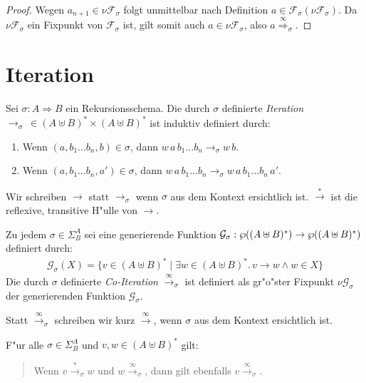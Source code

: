 \documentclass[12pt,a4paper]{article}
\begin{document}
\begin{proof}
  Wegen $a_{n+1}\in\nu\mathcal{F}_\sigma$ folgt unmittelbar nach Definition
  $a \in \mathcal{F}_\sigma(\nu\mathcal{F}_\sigma)$. Da $\nu\mathcal{F}_\sigma$
  ein Fixpunkt von $\mathcal{F}_\sigma$ ist, gilt somit auch $a \in \nu\mathcal{F}_\sigma$, also
  $a \stackrel{\infty}{\Rightarrow}_\sigma$.
\end{proof}


\section{Iteration}

\begin{definition}[Iteration]
  Sei $\sigma: A \Rightarrow B$ ein Rekursionsschema. Die durch $\sigma$ definierte \emph{Iteration}
  $\to_\sigma\ \in (A \uplus B)^* \times (A \uplus B)^*$ ist induktiv definiert durch:
  \begin{enumerate}
  \item Wenn $(a,b_1 \ldots b_n,b) \in \sigma$,
    dann $w\,a\,b_1 \ldots b_n \to_\sigma w\,b$.
  \item Wenn $(a,b_1 \ldots b_n,a') \in \sigma$,
    dann $w\,a\,b_1 \ldots b_n \to_\sigma w\,a\,b_1 \ldots b_n\,a'$.
  \end{enumerate}
\end{definition}
Wir schreiben $\to$ statt $\to_\sigma$ wenn $\sigma$ aus dem Kontext ersichtlich ist.
$\stackrel{*}{\to}$ ist die reflexive, transitive H"ulle von $\to$.

\begin{definition}[Co-Iteration]
  Zu jedem $\sigma \in \Sigma^A_B$ sei eine generierende Funktion
  $\mathcal{G}_\sigma:\wp((A \uplus B)^*) \to \wp((A \uplus B)^*)$ definiert durch:
  \[\begin{array}{rcl}
    \mathcal{G}_\sigma(X) = \{v \in (A \uplus B)^* \mid \exists w \in (A \uplus B)^*.\,v \rightarrow w \wedge w \in X\}
  \end{array}\]
  Die durch $\sigma$ definierte \emph{Co-Iteration} $\stackrel{\infty}{\rightarrow}_\sigma$ ist definiert
  als gr"o"ster Fixpunkt $\nu\mathcal{G}_\sigma$ der generierenden Funktion $\mathcal{G}_\sigma$.
\end{definition}
Statt $\stackrel{\infty}{\rightarrow}_\sigma$ schreiben wir kurz $\stackrel{\infty}{\rightarrow}$,
wenn $\sigma$ aus dem Kontext ersichtlich ist.

\begin{lemma} \label{lemma:Redex_Star_und_Infty}
  F"ur alle $\sigma \in \Sigma^A_B$ und $v,w \in (A \uplus B)^*$ gilt:
  \begin{quote}
    Wenn $v \stackrel{*}{\rightarrow}_\sigma w$ und $w \stackrel{\infty}{\rightarrow}_\sigma$,
    dann gilt ebenfalls $v \stackrel{\infty}{\rightarrow}_\sigma$.
  \end{quote}
\end{lemma}
\end{document}
